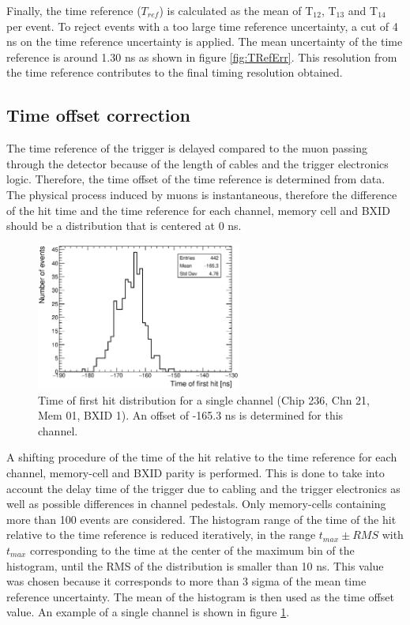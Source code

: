 \documentclass{JINST}
\begin{document}
Finally, the time reference ($T_{ref}$) is calculated as the mean of T$_{12}$, T$_{13}$ and T$_{14}$ per event. To reject events with a too large time reference uncertainty, a cut of 4 ns on the time reference uncertainty is applied. The mean uncertainty of the time reference is around 1.30 ns as shown in figure \ref{fig:TRefErr}. This resolution from the time reference contributes to the final timing resolution obtained.

\subsection{Time offset correction}
\label{sec:TimeOffset}

The time reference of the trigger is delayed compared to the muon passing through the detector because of the length of cables and the trigger electronics logic. Therefore, the time offset of the time reference is determined from data. The physical process induced by muons is instantaneous, therefore the difference of the hit time and the time reference for each channel, memory cell and BXID should be a distribution that is centered at 0 ns.

\begin{figure}[htbp!]
  \centering
  \includegraphics[width=0.6\textwidth]{fig/Timing_Chip236_Chn21_Mem01_BXID1_withOffset.eps}
  \caption{Time of first hit distribution for a single channel (Chip 236, Chn 21, Mem 01, BXID 1). An offset of -165.3 ns is determined for this channel.}\label{fig:TimeChnwithOffset}
\end{figure}

A shifting procedure of the time of the hit relative to the time reference for each channel, memory-cell and BXID parity is performed. This is done to take into account the delay time of the trigger due to cabling and the trigger electronics as well as possible differences in channel pedestals. Only memory-cells containing more than 100 events are considered. The histogram range of the time of the hit relative to the time reference is reduced iteratively, in the range $t_{max} \pm RMS$ with $t_{max}$ corresponding to the time at the center of the maximum bin of the histogram, until the RMS of the distribution is smaller than 10 ns. This value was chosen because it corresponds to more than 3 sigma of the mean time reference uncertainty. The mean of the histogram is then used as the time offset value. An example of a single channel is shown in figure \ref{fig:TimeChnwithOffset}.
\end{document}

